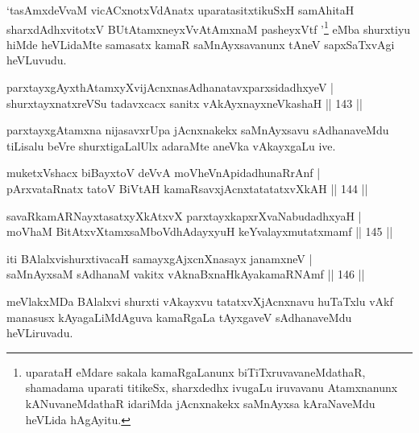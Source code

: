 \begin{artha}
`tasAmxdeVvaM vicACxnotxVdAnatx uparatasitxtikuSxH samAhitaH sharxdAdhxvitotxV BUtA\s\s tamxneyxVvA\s tAmxnaM pasheyxVtf '\footnote[1]{uparataH eMdare sakala kamaRgaLanunx biTiTxruvavaneMdathaR, shamadama uparati titikeSx, sharxdedhx ivugaLu iruvavanu Atamxnanunx kANuvaneMdathaR idariMda jAcnxnakekx saMnAyxsa kAraNaveMdu heVLida hAgAyitu.} eMba shurxtiyu hiMde heVLidaMte samasatx kamaR saMnAyxsavanunx tAneV sapxSaTxvAgi heVLuvudu.
\end{artha}

\begin{shl}
parxtayxgAyxthAtamxyXvijAcnxnasAdhanatavxparxsidadhxyeV |\\
shurxtayxnatxreVSu tadavxcacx sanitx vAkAyxnayxneVkashaH \hfill || 143 ||
\end{shl}	

\begin{artha}
parxtayxgAtamxna nijasavxrUpa jAcnxnakekx saMnAyxsavu sAdhanaveMdu tiLisalu beVre shurxtigaLalUlx adaraMte aneVka vAkayxgaLu ive. 
\end{artha}


\begin{shl}
muketxVshacx biBayxtoV deVvA moVheVnApidadhunaRrAnf |\\
pArxvataRnatx tatoV BiVtAH kamaRsavxjAcnxtatatatxvXkAH \hfill || 144 ||
\end{shl}

\begin{shl}
savaRkamARNayxtasatxyXkAtxvX parxtayxkapxrXvaNabudadhxyaH |\\
moVhaM BitAtxvX\s \s tamxsaMboVdhAdayxyuH keYvalayxmutatxmamf \hfill || 145 ||
\end{shl}

\begin{shl}
iti BAlalxvishurxtivacaH samayxgAjxcnXnasayx janamxneV |\\
saMnAyxsaM sAdhanaM vakitx vAknaBxnaHkAyakamaRNAmf \hfill || 146 ||
\end{shl}

\begin{artha}%
meVlakxMDa BAlalxvi shurxti vAkayxvu tatatxvXjAcnxnavu huTaTxlu vAkf manasusx kAyagaLiMdAguva kamaRgaLa tAyxgaveV sAdhanaveMdu heVLiruvadu.
\end{artha}


